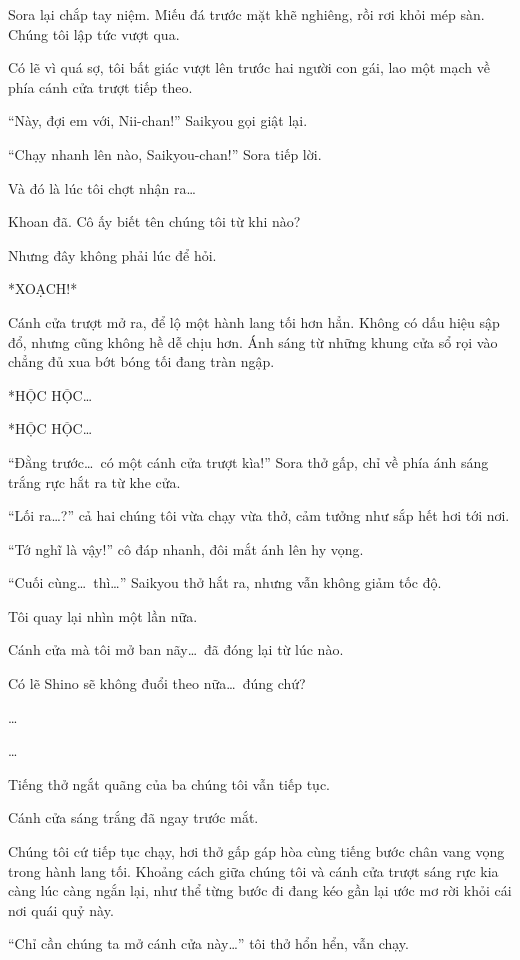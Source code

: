 \documentclass[../main.tex]{subfiles}
\begin{document}
Sora lại chắp tay niệm. Miếu đá trước mặt khẽ nghiêng, rồi rơi khỏi mép sàn. Chúng tôi lập tức vượt qua.

Có lẽ vì quá sợ, tôi bất giác vượt lên trước hai người con gái, lao một mạch về phía cánh cửa trượt tiếp theo.

``Này, đợi em với, Nii-chan!'' Saikyou gọi giật lại.

``Chạy nhanh lên nào, Saikyou-chan!'' Sora tiếp lời.

Và đó là lúc tôi chợt nhận ra\dots

Khoan đã. Cô ấy biết tên chúng tôi từ khi nào?

Nhưng đây không phải lúc để hỏi.

*XOẠCH!*

Cánh cửa trượt mở ra, để lộ một hành lang tối hơn hẳn. Không có dấu hiệu sập đổ, nhưng cũng không hề dễ chịu hơn. Ánh sáng từ những khung cửa sổ rọi vào chẳng đủ xua bớt bóng tối đang tràn ngập.

*HỘC HỘC\dots*

*HỘC HỘC\dots*

``Đằng trước\dots\ có một cánh cửa trượt kìa!'' Sora thở gấp, chỉ về phía ánh sáng trắng rực hắt ra từ khe cửa.


``Lối ra\dots?'' cả hai chúng tôi vừa chạy vừa thở, cảm tưởng như sắp hết hơi tới nơi.

``Tớ nghĩ là vậy!'' cô đáp nhanh, đôi mắt ánh lên hy vọng.

``Cuối cùng\dots\ thì\dots'' Saikyou thở hắt ra, nhưng vẫn không giảm tốc độ.

Tôi quay lại nhìn một lần nữa.

Cánh cửa mà tôi mở ban nãy\dots\ đã đóng lại từ lúc nào.

Có lẽ Shino sẽ không đuổi theo nữa\dots\ đúng chứ?

\dots

\dots

Tiếng thở ngắt quãng của ba chúng tôi vẫn tiếp tục.

Cánh cửa sáng trắng đã ngay trước mắt.

Chúng tôi cứ tiếp tục chạy, hơi thở gấp gáp hòa cùng tiếng bước chân vang vọng trong hành lang tối. Khoảng cách giữa chúng tôi và cánh cửa trượt sáng rực kia càng lúc càng ngắn lại, như thể từng bước đi đang kéo gần lại ước mơ rời khỏi cái nơi quái quỷ này.

``Chỉ cần chúng ta mở cánh cửa này\dots'' tôi thở hổn hển, vẫn chạy.
\end{document}
